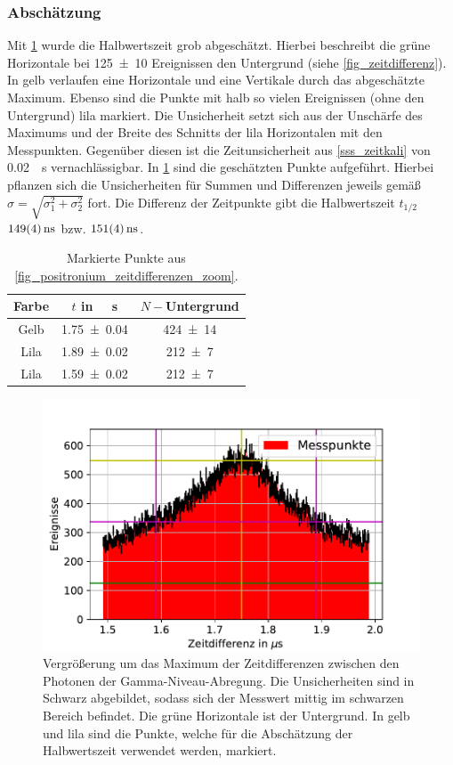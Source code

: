 \documentclass[
	a4paper,
	12pt,
	pagesize,
	ngerman
]{scrartcl}
\begin{document}
		\subsubsection*{Abschätzung}
		Mit \cref{fig_zeitdifferenz_zoom} wurde die Halbwertszeit grob abgeschätzt.
		Hierbei beschreibt die grüne Horizontale bei \SI{125+-10}{} Ereignissen den Untergrund (siehe \cref{fig_zeitdifferenz}).
		In gelb verlaufen eine Horizontale und eine Vertikale durch das abgeschätzte Maximum.
		Ebenso sind die Punkte mit halb so vielen Ereignissen (ohne den Untergrund) lila markiert.
		Die Unsicherheit setzt sich aus der Unschärfe des Maximums und der Breite des Schnitts der lila Horizontalen mit den Messpunkten.
		Gegenüber diesen ist die Zeitunsicherheit aus \cref{sss_zeitkali} von \SI{0.02}{\mu s} vernachlässigbar.
		In \cref{tb_punkte} sind die geschätzten Punkte aufgeführt.
		Hierbei pflanzen sich die Unsicherheiten für Summen und Differenzen jeweils gemäß $\sigma=\sqrt{\sigma_1^2+\sigma_2^2}$ fort.
		Die Differenz der Zeitpunkte gibt die Halbwertszeit $t_{1/2}$ $\SI{149+-4}{ns}$ bzw. $\SI{151+-4}{ns}$.

		\begin{table}[H]
		\centering
		\begin{tabular}{c| c | c }
			 Farbe&$t$ in \SI{}{\mu s}&$N-$Untergrund\\ \hline
			 Gelb&\SI{1.75+-0.04}{}&\SI{424+-14}{}\\
			 Lila&\SI{1.89+-0.02}{}&\SI{212+-7}{}\\
			 Lila&\SI{1.59+-0.02}{}&\SI{212+-7}{}\\
		\end{tabular}
		\caption{
			Markierte Punkte aus \cref{fig_positronium_zeitdifferenzen_zoom}.
		}
			 \label{tb_punkte}
	\end{table}
		\begin{figure}[H]
				\includegraphics[width= 0.7 \linewidth]{img/Zeitdifferenzen_zoom}
				\caption{
				Vergrößerung um das Maximum der Zeitdifferenzen zwischen den Photonen der Gamma-Niveau-Abregung.
				Die Unsicherheiten sind in Schwarz abgebildet, sodass sich der Messwert mittig im schwarzen Bereich befindet.
				Die grüne Horizontale ist der Untergrund.
				In gelb und lila sind die Punkte, welche für die Abschätzung der Halbwertszeit verwendet werden, markiert.
				}
				\label{fig_zeitdifferenz_zoom}
		\end{figure}
\end{document}

